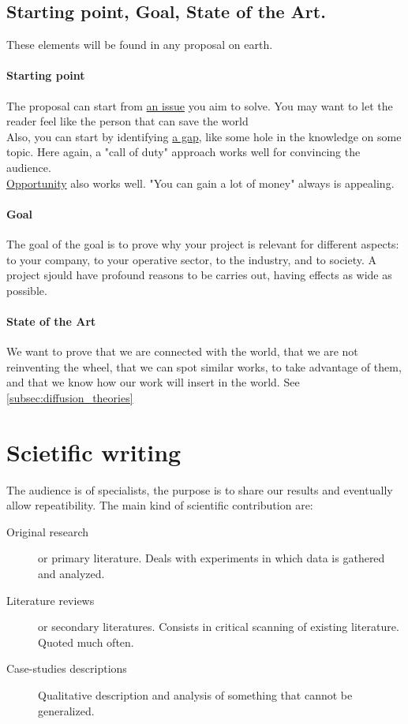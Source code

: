 \documentclass{article}
\begin{document}
\subsection{Starting point, Goal, State of the Art.} 
These elements will be found in any proposal on earth.
\paragraph{Starting point} 
The proposal can start from \underline{an issue} you aim to solve. You may want to let the reader feel like the person that can save the world\\
Also, you can start by identifying \underline{a gap}, like some hole in the knowledge on some topic. Here again, a "call of duty" approach works well for convincing the audience.\\
\underline{Opportunity} also works well. "You can gain a lot of money" always is appealing.
\paragraph{Goal} The goal of the goal is to prove why your project is relevant for different aspects: to your company, to your operative sector, to the industry, and to society. A project sjould have profound reasons to be carries out, having effects as wide as possible.
\paragraph{State of the Art} We want to prove that we are connected with the world, that we are not reinventing the wheel, that we can spot similar works, to take advantage of them, and that we know how our work will insert in the world. See \ref{subsec:diffusion_theories}





\section{Scietific writing}
The audience is of specialists, the purpose is to share our results and eventually allow repeatibility. The main kind of scientific contribution are:
\begin{description}
\item[Original research] or primary literature. Deals with experiments in which data is gathered and analyzed.
\item[Literature reviews] or secondary literatures. Consists in critical scanning of existing literature. Quoted much often.
\item[Case-studies descriptions] Qualitative description and analysis of something that cannot be generalized.
\end{description}
\end{document}
